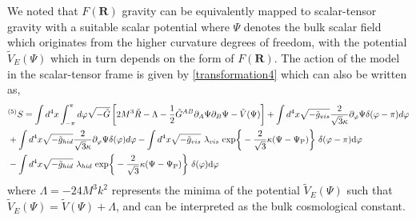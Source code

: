 \documentclass{article}
\begin{document}
We noted that $F(\mathbf{R})$ gravity can be equivalently mapped to scalar-tensor gravity with a suitable scalar potential where $\Psi$ denotes the bulk scalar field which originates from the higher curvature degrees of freedom, with the potential $\tilde{V}_E(\Psi)$ which in turn depends on the form of $F(\mathbf{R})$. The action of the model in the scalar-tensor frame is given by \ref{transformation4} which can also be written as,
\begin{align}
&^{(5)} S = \int d^4x \int_{-\pi}^{\pi}d\varphi \sqrt{-\tilde{G}}\left[2M^3\tilde{R} - \Lambda - \frac{1}{2}\tilde{G}^{AB}\partial_{A}\Psi\partial_{B}\Psi - \tilde{V}(\Psi)\right] + \int d^4 x \sqrt{-\tilde{g}_{vis}} \frac{2}{\sqrt{3}\kappa} \partial_\varphi \Psi\delta(\varphi-\pi) d\varphi 
\nonumber \\
&+  \int d^4 x \sqrt{-\tilde{g}_{hid}} \frac{2}{\sqrt{3}\kappa} \partial_\varphi \Psi\delta(\varphi) d\varphi - \int d^4 x \sqrt{-\tilde{g}_{vis}}~\lambda_{vis} ~\rm exp\bigg\lbrace-{{\frac{2}{\sqrt{3}}}\kappa(\Psi-\Psi_P)}\bigg\rbrace~\delta(\varphi-\pi) d\varphi  \nonumber \\
&- \int d^4 x \sqrt{-\tilde{g}_{hid}} ~\lambda_{hid}~\rm exp\bigg\lbrace-{{\frac{2}{\sqrt{3}}}\kappa(\Psi-\Psi_P)}\bigg\rbrace~ \delta(\varphi)d\varphi
\label{5D action}
\end{align}
where $\Lambda=-24M^3k^2$ represents the minima of the potential $\tilde{V}_E(\Psi)$ such that $\tilde{V}_E(\Psi)=\tilde{V}(\Psi) + \Lambda$, and can be interpreted as the bulk cosmological constant. \\
\end{document}
